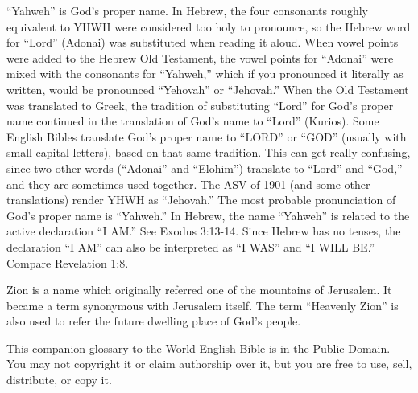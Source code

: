 {\par }{\ILIB “Yahweh” is God’s proper name. In Hebrew, the four consonants roughly equivalent to YHWH were considered too holy to pronounce, so the Hebrew word for “Lord” (Adonai) was substituted when reading it aloud. When vowel points were added to the Hebrew Old Testament, the vowel points for “Adonai” were mixed with the consonants for “Yahweh,” which if you pronounced it literally as written, would be pronounced “Yehovah” or “Jehovah.” When the Old Testament was translated to Greek, the tradition of substituting “Lord” for God’s proper name continued in the translation of God’s name to “Lord” (Kurios). Some English Bibles translate God’s proper name to “LORD” or “GOD” (usually with small capital letters), based on that same tradition. This can get really confusing, since two other words (“Adonai” and “Elohim”) translate to “Lord” and “God,” and they are sometimes used together. The ASV of 1901 (and some other translations) render YHWH as “Jehovah.” The most probable pronunciation of God’s proper name is “Yahweh.” In Hebrew, the name “Yahweh” is related to the active declaration “I AM.” See Exodus 3:13-14. Since Hebrew has no tenses, the declaration “I AM” can also be interpreted as “I WAS” and “I WILL BE.” Compare Revelation 1:8.
\par }{
\par }{\ILIB Zion is a name which originally referred one of the mountains of Jerusalem. It became a term synonymous with Jerusalem itself. The term “Heavenly Zion” is also used to refer the future dwelling place of God’s people.
\par }{\IP This companion glossary to the World English Bible is in the Public Domain. You may not copyright it or claim authorship over it, but you are free to use, sell, distribute, or copy it.

\par }